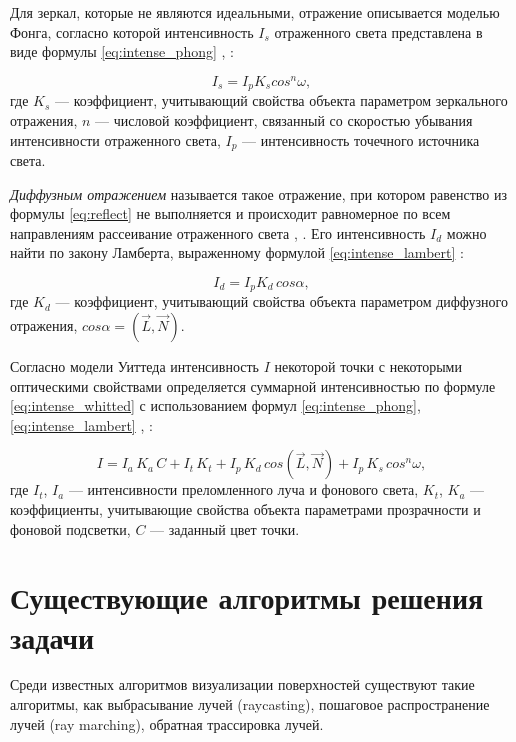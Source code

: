 Для зеркал, которые не являются идеальными, отражение описывается моделью Фонга, согласно которой интенсивность $I_s$ отраженного света представлена в виде формулы \ref{eq:intense_phong} \cite{порев2002компьютерная}, \cite{демин2011}:

\begin{equation}\label{eq:intense_phong}
	I_s=I_p K_s cos^n{\omega},
\end{equation}
где $K_s$ --- коэффициент, учитывающий свойства объекта параметром зеркального отражения, $n$ --- числовой коэффициент, связанный со скоростью убывания интенсивности отраженного света, $I_p$ --- интенсивность точечного источника света.

\textit{Диффузным отражением} называется такое отражение, при котором равенство из формулы \ref{eq:reflect} не выполняется и происходит равномерное по всем направлениям рассеивание отраженного света \cite{порев2002компьютерная}, \cite{демин2011}.
Его интенсивность $I_d$ можно найти по закону Ламберта, выраженному формулой \ref{eq:intense_lambert} \cite{демин2011}:

\begin{equation}\label{eq:intense_lambert}
	I_d=I_p K_d \, cos{\alpha},
\end{equation}
где $K_d$ --- коэффициент, учитывающий свойства объекта параметром диффузного отражения, $cos{\alpha} = (\overrightarrow L, \overrightarrow N)$.

Согласно модели Уиттеда интенсивность $I$ некоторой точки  с некоторыми оптическими свойствами определяется суммарной интенсивностью по формуле \ref{eq:intense_whitted} с использованием формул \ref{eq:intense_phong}, \ref{eq:intense_lambert} \cite{порев2002компьютерная}, \cite{демин2011}:

\begin{equation}\label{eq:intense_whitted}
	I = I_a \, K_a \, C + I_t \, K_t + I_p \, K_d \, cos(\overrightarrow L, \overrightarrow N) + I_p \, K_s \, cos^n{\omega},
\end{equation}
где $I_t$, $I_a$ --- интенсивности преломленного луча и фонового света, $K_t$, $K_a$ --- коэффициенты, учитывающие свойства объекта параметрами прозрачности и фоновой подсветки, $C$ --- заданный цвет точки.

\section{Существующие алгоритмы решения задачи}

Среди известных алгоритмов визуализации поверхностей существуют такие алгоритмы, как выбрасывание лучей (raycasting), пошаговое распространение лучей (ray marching), обратная трассировка	 лучей.

